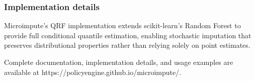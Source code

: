 \subsubsection{Implementation details}

Microimpute's QRF implementation extends scikit-learn's Random Forest to provide full conditional quantile estimation, enabling stochastic imputation that preserves distributional properties rather than relying solely on point estimates.

Complete documentation, implementation details, and usage examples are available at https://policyengine.github.io/microimpute/.